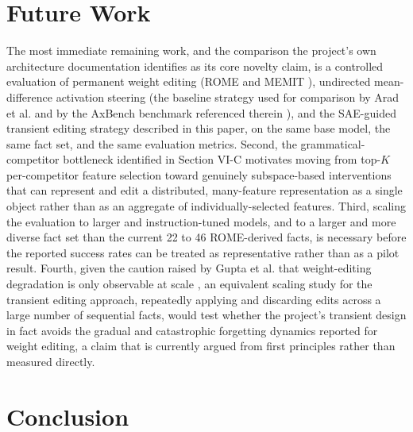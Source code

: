 \documentclass[conference]{IEEEtran}
\begin{document}
\section{Future Work}

The most immediate remaining work, and the comparison the project's own architecture documentation identifies as its core novelty claim, is a controlled evaluation of permanent weight editing (ROME and MEMIT \cite{meng2022rome}), undirected mean-difference activation steering (the baseline strategy used for comparison by Arad et al. and by the AxBench benchmark referenced therein \cite{arad2025steering}), and the SAE-guided transient editing strategy described in this paper, on the same base model, the same fact set, and the same evaluation metrics. Second, the grammatical-competitor bottleneck identified in Section VI-C motivates moving from top-$K$ per-competitor feature selection toward genuinely subspace-based interventions that can represent and edit a distributed, many-feature representation as a single object rather than as an aggregate of individually-selected features. Third, scaling the evaluation to larger and instruction-tuned models, and to a larger and more diverse fact set than the current 22 to 46 ROME-derived facts, is necessary before the reported success rates can be treated as representative rather than as a pilot result. Fourth, given the caution raised by Gupta et al. that weight-editing degradation is only observable at scale \cite{gupta2024forgetting}, an equivalent scaling study for the transient editing approach, repeatedly applying and discarding edits across a large number of sequential facts, would test whether the project's transient design in fact avoids the gradual and catastrophic forgetting dynamics reported for weight editing, a claim that is currently argued from first principles rather than measured directly.

\section{Conclusion}
\end{document}
